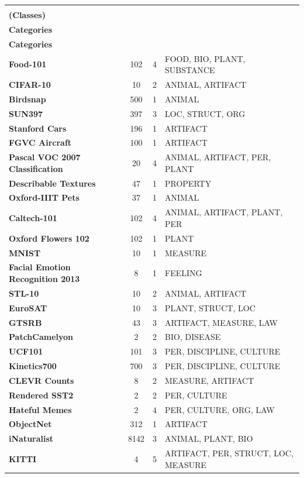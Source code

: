 \documentclass[11pt]{article}
\begin{document}
\begin{table}[t]
\centering
\setlength{\tabcolsep}{5pt}
\begin{tabularx}{\textwidth}{lcc>{\raggedright\arraybackslash}X}
    \toprule
  & \makecell{\textbf{Concepts} \\ \textbf{(Classes)}} & \makecell{\textbf{Semantic} \\ \textbf{Categories}} & \makecell{\textbf{CNER} \\ \textbf{Categories}} \\
    \midrule
  
\textbf{Food-101} & 102 & 4 & FOOD, BIO, PLANT, SUBSTANCE \\
\textbf{CIFAR-10} & 10 & 2 & ANIMAL, ARTIFACT \\
\textbf{Birdsnap} & 500 & 1 & ANIMAL \\
\textbf{SUN397} & 397 & 3 & LOC, STRUCT, ORG \\
\textbf{Stanford Cars} & 196 & 1 & ARTIFACT \\
\textbf{FGVC Aircraft} & 100 & 1 & ARTIFACT \\
\textbf{Pascal VOC 2007 Classification} & 20 & 4 & ANIMAL, ARTIFACT, PER, PLANT \\
\textbf{Describable Textures} & 47 & 1 & PROPERTY \\
\textbf{Oxford-IIIT Pets} & 37 & 1 & ANIMAL \\
\textbf{Caltech-101} & 102 & 4 & ANIMAL, ARTIFACT, PLANT, PER \\
\textbf{Oxford Flowers 102}  & 102 & 1 & PLANT \\
\textbf{MNIST }& 10 & 1 & MEASURE \\
\textbf{Facial Emotion Recognition 2013} & 8 & 1 & FEELING \\
\textbf{STL-10} & 10 & 2 & ANIMAL, ARTIFACT \\
\textbf{EuroSAT} & 10 & 3 & PLANT, STRUCT, LOC \\
\textbf{GTSRB} & 43 & 3 & ARTIFACT, MEASURE, LAW \\
\textbf{PatchCamelyon} & 2 & 2 & BIO, DISEASE \\
\textbf{UCF101} & 101 & 3 & PER, DISCIPLINE, CULTURE \\
\textbf{Kinetics700} & 700 & 3 & PER, DISCIPLINE, CULTURE \\
\textbf{CLEVR Counts} & 8 & 2 & MEASURE, ARTIFACT \\
\textbf{Rendered SST2} & 2 & 2 & PER, CULTURE \\
\textbf{Hateful Memes} & 2 & 4 & PER, CULTURE, ORG, LAW \\
\textbf{ObjectNet}  & 312 & 1 & ARTIFACT \\
\textbf{iNaturalist}  & 8142 & 3 & ANIMAL, PLANT, BIO \\
\textbf{KITTI} & 4 & 5 & ARTIFACT, PER, STRUCT, LOC, MEASURE \\


\end{tabularx}
\end{table}
\end{document}
